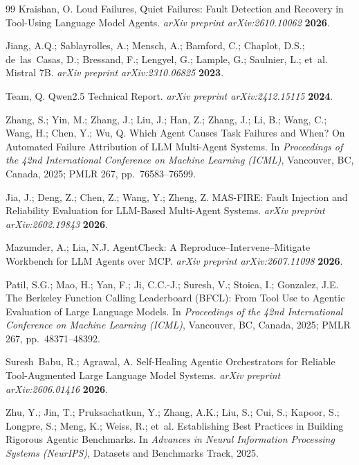 \documentclass[make,article,submit,moreauthors,pdftex]{mdpi}
\begin{document}
\begin{thebibliography}{99}
Kraishan, O.
\newblock Loud Failures, Quiet Failures: Fault Detection and Recovery in Tool-Using Language Model Agents.
\newblock \textit{arXiv preprint arXiv:2610.10062} \textbf{2026}.

Jiang, A.Q.; Sablayrolles, A.; Mensch, A.; Bamford, C.; Chaplot, D.S.; de~las~Casas, D.; Bressand, F.; Lengyel, G.; Lample, G.; Saulnier, L.; et~al.
\newblock Mistral 7B.
\newblock \textit{arXiv preprint arXiv:2310.06825} \textbf{2023}.

Team, Q.
\newblock Qwen2.5 Technical Report.
\newblock \textit{arXiv preprint arXiv:2412.15115} \textbf{2024}.

Zhang, S.; Yin, M.; Zhang, J.; Liu, J.; Han, Z.; Zhang, J.; Li, B.; Wang, C.; Wang, H.; Chen, Y.; Wu, Q.
\newblock Which Agent Causes Task Failures and When? On Automated Failure Attribution of LLM Multi-Agent Systems.
\newblock In \textit{Proceedings of the 42nd International Conference on Machine Learning (ICML)}, Vancouver, BC, Canada, 2025; PMLR 267, pp.~76583--76599.

Jia, J.; Deng, Z.; Chen, Z.; Wang, Y.; Zheng, Z.
\newblock MAS-FIRE: Fault Injection and Reliability Evaluation for LLM-Based Multi-Agent Systems.
\newblock \textit{arXiv preprint arXiv:2602.19843} \textbf{2026}.

Mazumder, A.; Lia, N.J.
\newblock AgentCheck: A Reproduce--Intervene--Mitigate Workbench for LLM Agents over MCP.
\newblock \textit{arXiv preprint arXiv:2607.11098} \textbf{2026}.

Patil, S.G.; Mao, H.; Yan, F.; Ji, C.C.-J.; Suresh, V.; Stoica, I.; Gonzalez, J.E.
\newblock The Berkeley Function Calling Leaderboard (BFCL): From Tool Use to Agentic Evaluation of Large Language Models.
\newblock In \textit{Proceedings of the 42nd International Conference on Machine Learning (ICML)}, Vancouver, BC, Canada, 2025; PMLR 267, pp.~48371--48392.

Suresh~Babu, R.; Agrawal, A.
\newblock Self-Healing Agentic Orchestrators for Reliable Tool-Augmented Large Language Model Systems.
\newblock \textit{arXiv preprint arXiv:2606.01416} \textbf{2026}.

Zhu, Y.; Jin, T.; Pruksachatkun, Y.; Zhang, A.K.; Liu, S.; Cui, S.; Kapoor, S.; Longpre, S.; Meng, K.; Weiss, R.; et~al.
\newblock Establishing Best Practices in Building Rigorous Agentic Benchmarks.
\newblock In \textit{Advances in Neural Information Processing Systems (NeurIPS)}, Datasets and Benchmarks Track, 2025.

\end{thebibliography}
\end{document}
